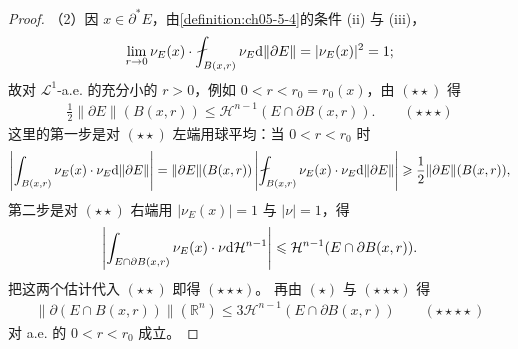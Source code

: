 \documentclass[../../main.tex]{subfiles}%
\begin{document}
\begin{proof}
（2）因 $x\in\partial^*E$，由\cref{definition:ch05-5-4}的条件 (ii) 与 (iii)，%
\begin{align*}
\lim_{r\to0}\nu_E(x)\cdot\fint_{B(x,r)}\nu_E\diff\lVert\partial E\rVert=\lvert\nu_E(x)\rvert^2=1 ;
\end{align*}
故对 $\mathcal{L}^1$-a.e. 的充分小的 $r>0$，例如 $0<r<r_0=r_0(x)$，由 $(\star\star)$ 得
\begin{align*}
\frac{1}{2}\lVert\partial E\rVert(B(x,r))\leqslant\mathcal{H}^{n-1}(E\cap\partial B(x,r)) .\qquad(\star\star\star)
\end{align*}
这里的第一步是对 $(\star\star)$ 左端用球平均：当 $0<r<r_0$ 时
\begin{align*}
\left\lvert\int_{B(x,r)}\nu_E(x)\cdot\nu_E\diff\lVert\partial E\rVert\right\rvert
=\lVert\partial E\rVert(B(x,r))\left\lvert\fint_{B(x,r)}\nu_E(x)\cdot\nu_E\diff\lVert\partial E\rVert\right\rvert
\geqslant\frac{1}{2}\lVert\partial E\rVert(B(x,r)),
\end{align*}
第二步是对 $(\star\star)$ 右端用 $\lvert\nu_E(x)\rvert=1$ 与 $\lvert\nu\rvert=1$，得
\begin{align*}
\left\lvert\int_{E\cap\partial B(x,r)}\nu_E(x)\cdot\nu\mathrm{d}\mathcal{H}^{n-1}\right\rvert\leqslant\mathcal{H}^{n-1}(E\cap\partial B(x,r)) .
\end{align*}
把这两个估计代入 $(\star\star)$ 即得 $(\star\star\star)$。
再由 $(\star)$ 与 $(\star\star\star)$ 得
\begin{align*}
\lVert\partial(E\cap B(x,r))\rVert(\mathbb{R}^n)\leqslant3\mathcal{H}^{n-1}(E\cap\partial B(x,r))\qquad(\star\star\star\star)
\end{align*}
对 a.e. 的 $0<r<r_0$ 成立。


\end{proof}
\end{document}

